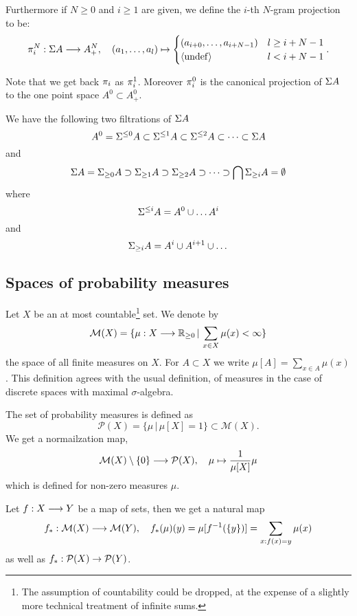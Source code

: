 \documentclass[11pt]{article}
\begin{document}
Furthermore if $N \geq 0$ and $i \geq 1$ are given, we define the $i$-th $N$-gram
projection to be:
\[ {\pi_{i}^{N}}: \Sigma A \longrightarrow A^N_+, \quad (a_1, \dots, a_l) \mapsto
\begin{cases}
(a_{i+0},\dots,a_{i+N-1})  & l \geq i+N-1  \\
\langle \mathrm{undef} \rangle                   & l < i+N-1
\end{cases}.\]

Note that we get back ${\pi_{i}}$ as ${\pi_{i}^{1}}$. Moreover ${\pi_{i}^{0}}$ is the
canonical projection of $\Sigma A$ to the one point space $A^0 \subset
A^0_+$.

We have the following two filtrations of $\Sigma A$
\[ A^0 = \Sigma^{\leq 0} A \subset \Sigma^{\leq 1} A \subset \Sigma^{\leq
  2} A \subset \dots \subset \Sigma A \]
and 
\[ \Sigma A = \Sigma_{\geq 0} A \supset \Sigma_{\geq 1} A \supset \Sigma_{\geq
  2} A \supset \dots \supset \bigcap \Sigma_{\geq i} A = \emptyset  \]
where 
\[ \Sigma^{\leq i} A = A^{0} \cup \dots A^{i} \]
and
\[ \Sigma_{\geq i} A = A^{i} \cup A^{i + 1} \cup \dots \]

\subsection{Spaces of probability measures}
\label{sec-1-2}

\newcommand{\MES}{\mathcal{M}}  %
\newcommand{\PROB}{\mathcal{P}}  %
\newcommand{\EXP}[2]{E_{#1}[#2]} %

Let $X$ be an at most countable\footnote{The assumption of
  countability could be dropped, at the expense of a slightly more
  technical treatment of infinite sums.} set. We denote by
\[ 
   \MES(X) = \{ \mu: X \lra \IR_{\geq 0} \,|\, \sum_{x \in X} \mu(x) <
\infty \}
\]
the space of all finite measures on $X$. For $A \subset X$ we write
$\mu[A] = \sum_{x \in A} \mu(x)$. This definition agrees with the
usual definition, of measures in the case of discrete spaces with
maximal $\sigma$-algebra.

The set of probability measures is defined as
\[ \PROB(X) = \{ \mu  \,|\,  \mu[X] = 1 \} \subset \MES(X). \]
We get a normailzation map,
\[ \MES (X) \setminus \{0\} \lra \PROB (X), \quad \mu \mapsto
\frac{1}{\mu[X]} \mu \]
which is defined for non-zero measures $\mu$.

Let $f:X \longrightarrow Y$ be a map of sets, then we get a natural map
\[ f_*: \MES(X) \lra \MES(Y), \quad
   f_*(\mu)(y) = \mu[ f^{-1}(\{y\})] = \sum_{x:f(x)=y} \mu(x) \]
as well as $f_*: \PROB(X) \ra \PROB(Y)$.
\end{document}
